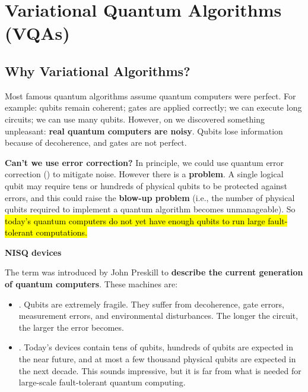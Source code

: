 \section{Variational Quantum Algorithms (VQAs)}\label{sec:variational-quantum-algorithms-vqas}

\subsection{Why Variational Algorithms?}\label{sec:why-variational-algorithms}

Most famous quantum algorithms assume quantum computers were perfect. For example: qubits remain coherent; gates are applied correctly; we can execute long circuits; we can use many qubits. However, on  we discovered something unpleasant: \textbf{real quantum computers are noisy}. Qubits lose information because of decoherence, and gates are not perfect.

\highspace
\textcolor{Red2}{ \textbf{Can't we use error correction?}} In principle, we could use quantum error correction () to mitigate noise. However there is a \textbf{problem}. A single logical qubit may require tens or hundreds of physical qubits to be protected against errors, and this could raise the \textbf{blow-up problem} (i.e., the number of physical qubits required to implement a quantum algorithm becomes unmanageable). So \hl{today's quantum computers do not yet have enough qubits to run large fault-tolerant computations.}

\highspace
\begin{flushleft}
    \textcolor{Green3}{ \textbf{NISQ devices}}
\end{flushleft}
The term  was introduced by John Preskill to \textbf{describe the current generation of quantum computers}. These machines are:
\begin{itemize}
    \item {}. Qubits are extremely fragile. They suffer from decoherence, gate errors, measurement errors, and environmental disturbances. The longer the circuit, the larger the error becomes.

    
    \item {}. Today's devices contain tens of qubits, hundreds of qubits are expected in the near future, and at most a few thousand physical qubits are expected in the next decade. This sounds impressive, but it is far from what is needed for large-scale fault-tolerant quantum computing.
\end{itemize}

